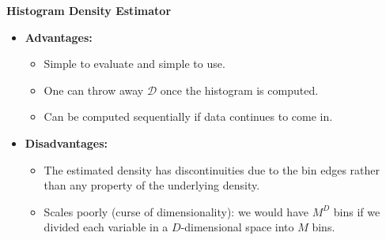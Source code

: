\documentclass{../cheat}
\begin{document}
\begin{multicols}{3}
		
		\textbf{Histogram Density Estimator}
		\begin{itemize}
			\item \textbf{Advantages:}
				\begin{itemize}
					\item Simple to evaluate and simple to use.
					\item One can throw away $\mathcal{D}$ once the histogram is computed.
					\item Can be computed sequentially if data continues to come in.
				\end{itemize}
			\item \textbf{Disadvantages:}
				\begin{itemize}
					\item The estimated density has discontinuities due to the bin edges rather than any property of the underlying density.
					\item Scales poorly (curse of dimensionality): we would have $M^D$ bins if we divided each variable in a $D$-dimensional space into $M$ bins.
				\end{itemize}
		\end{itemize}
		

\end{multicols}
\end{document}
